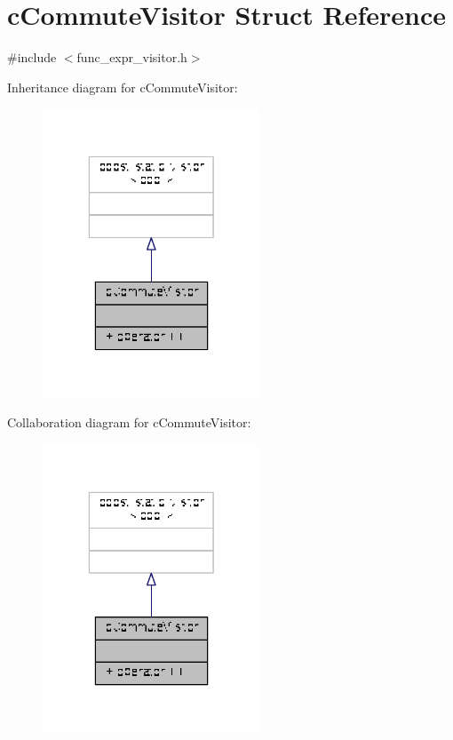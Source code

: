 \hypertarget{structcCommuteVisitor}{\section{c\-Commute\-Visitor Struct Reference}
\label{structcCommuteVisitor}
}


{\ttfamily \#include $<$func\-\_\-expr\-\_\-visitor.\-h$>$}



Inheritance diagram for c\-Commute\-Visitor\-:
\nopagebreak
\begin{figure}[H]
\begin{center}
\leavevmode
\includegraphics[width=184pt]{structcCommuteVisitor__inherit__graph}
\end{center}
\end{figure}


Collaboration diagram for c\-Commute\-Visitor\-:
\nopagebreak
\begin{figure}[H]
\begin{center}
\leavevmode
\includegraphics[width=184pt]{structcCommuteVisitor__coll__graph}
\end{center}
\end{figure}
